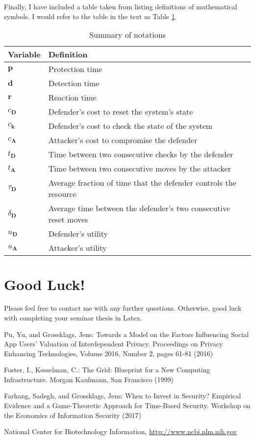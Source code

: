 \documentclass[runningheads,a4paper]{llncs}
\begin{document}
Finally, I have included a table taken from \cite{Farhang2017} listing definitions of mathematical symbols. I would refer to the table in the text as Table \ref{table:symbols}.

 \begin{table}[t]
 	\centering
 	\caption{Summary of notations}\label{tab:Notation}
 	{\begin{tabular}{ll}
 			\hline
 			Variable & Definition \\
 			\hline
 			$\mathbf{p}$ & Protection time \\
 			$\mathbf{d}$ & Detection time \\
 			$\mathbf{r}$ & Reaction time \\
 			$c_{\mathbf{D}}$ & Defender's cost to reset the system's state \\
 			$c_\mathbf{k}$  & Defender's cost to check the state of the system \\
 			$c_{\mathbf{A}}$ & Attacker's cost to compromise the defender \\
 			$t_\mathbf{D}$ & Time between two consecutive checks by the defender \\
 			$t_{\mathbf{A}}$ & Time between two consecutive moves by the attacker \\
 			$\tau_{\mathbf{D}}$ & Average fraction of time that the defender controls the resource \\
 			$\delta_{\mathbf{D}}$ & Average time between the defender's two consecutive reset moves \\
 			$u_{\mathbf{D}}$ & Defender's utility \\
 			$u_{\mathbf{A}}$ & Attacker's utility \\
 			\hline
 		\end{tabular}
 	}
 	\label{table:symbols}
 \end{table}

\section{Good Luck!}

Please feel free to contact me with any further questions. Otherwise, good luck with completing your seminar thesis in Latex.

\begin{thebibliography}{4}

 Pu, Yu, and Grossklags, Jens: Towards a Model on the Factors Influencing Social App Users' Valuation of Interdependent Privacy. Proceedings on Privacy Enhancing Technologies, Volume 2016, Number 2, pages 61-81 (2016)

 Foster, I., Kesselman, C.: The Grid: Blueprint for a New Computing
Infrastructure. Morgan Kaufmann, San Francisco (1999)

 Farhang, Sadegh, and Grossklags, Jens: When to Invest in Security? Empirical Evidence and a
Game-Theoretic Approach for Time-Based Security. Workshop on the Economics of Information Security (2017)

 National Center for Biotechnology Information, \url{http://www.ncbi.nlm.nih.gov}

\end{thebibliography}
\end{document}
